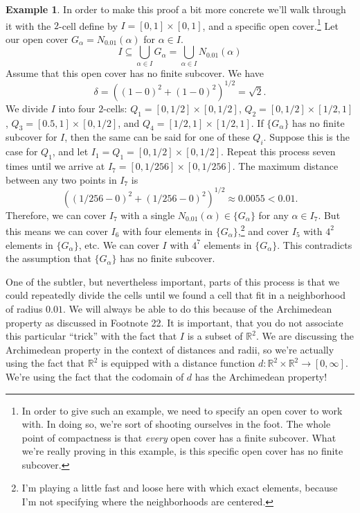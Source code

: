 \documentclass{article}
\newcommand{\R}{\mathbb{R}}
\theoremstyle{definition}
\newtheorem{example}{Example}[section]
\begin{document}
\begin{example}
	In order to make this proof a bit more concrete we'll walk through it with the $ 2 $-cell define by $ I=[0,1]\times[0,1] $, and a specific open cover.\footnote{In order to give such an example, we need to specify an open cover to work with. In doing so, we're sort of shooting ourselves in the foot. The whole point of compactness is that \textit{every} open cover has a finite subcover. What we're really proving in this example, is this specific open cover has no finite subcover.} Let our open cover $ G_\alpha=N_{0.01}(\alpha)  $ for $ \alpha\in I $. $$ I\subseteq \bigcup_{\alpha\in I} G_\alpha=\bigcup_{\alpha\in I}N_{0.01}(\alpha)$$  Assume that this open cover has no finite subcover. We have $$ \delta=((1-0)^2+(1-0)^2)^{1/2}=\sqrt{2} .$$ We divide $ I $ into four $ 2 $-cells: $ Q_1=[0,1/2]\times[0,1/2] $, $Q_2=[0,1/2]\times[1/2,1]$, $ Q_3=[0.5,1]\times[0,1/2] $, and $ Q_4=[1/2,1]\times[1/2,1] $. If $ \{G_\alpha\} $ has no finite subcover for $ I $, then the same can be said for one of these $ Q_i $. Suppose this is the case for $ Q_1 $, and let $ I_1=Q_1=[0,1/2]\times[0,1/2] $. Repeat this process seven times until we arrive at $ I_7=[0,1/256]\times[0,1/256] $. The maximum distance between any two points in $ I_7 $ is $$ \left((1/256-0)^2+(1/256-0)^2\right)^{1/2}\approx0.0055<0.01.$$ Therefore, we can cover $ I_7 $ with a single $ N_{0.01}(\alpha) \in\{G_\alpha\}$ for any $ \alpha\in I_7 $. But this means we can cover $ I_6 $ with four elements in $ \{G_\alpha\} $,\footnote{I'm playing a little fast and loose here with which exact elements, because I'm not specifying where the neighborhoods are centered.}  and cover $ I_5 $ with $ 4^2 $ elements in $ \{G_\alpha\}  $, etc. We can cover $ I $ with $ 4^7 $ elements in $ \{G_\alpha\} $. This contradicts the assumption that $ \{G_\alpha\} $ has no finite subcover. 
	
	One of the subtler, but nevertheless important, parts of this process is that we could repeatedly divide the cells until we found a cell that fit in a neighborhood of radius $ 0.01 $. We will always be able to do this because of the Archimedean property as discussed in Footnote 22. It is important, that you do not associate this particular ``trick'' with the fact that $ I $ is a subset of $ \R^2 $. We are discussing the Archimedean property in the context of distances and radii, so we're actually using the fact that $ \R^2  $ is equipped with a distance function $ d:\R^2\times\R^2\to[0,\infty] $. We're using the fact that the codomain of $ d $ has the Archimedean property!  
\end{example}
\end{document}
